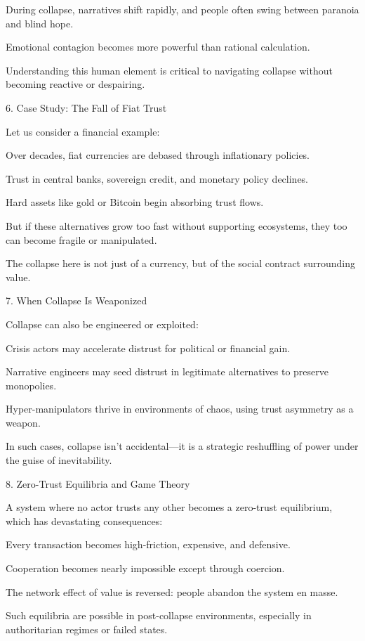 \documentclass[11pt,oneside]{book}
\begin{document}
    During collapse, narratives shift rapidly, and people often swing between paranoia and blind hope.

    Emotional contagion becomes more powerful than rational calculation.

Understanding this human element is critical to navigating collapse without becoming reactive or despairing.

6. Case Study: The Fall of Fiat Trust


Let us consider a financial example:

    Over decades, fiat currencies are debased through inflationary policies.

    Trust in central banks, sovereign credit, and monetary policy declines.

    Hard assets like gold or Bitcoin begin absorbing trust flows.

    But if these alternatives grow too fast without supporting ecosystems, they too can become fragile or manipulated.

The collapse here is not just of a currency, but of the social contract surrounding value.

7. When Collapse Is Weaponized


Collapse can also be engineered or exploited:

    Crisis actors may accelerate distrust for political or financial gain.

    Narrative engineers may seed distrust in legitimate alternatives to preserve monopolies.

    Hyper-manipulators thrive in environments of chaos, using trust asymmetry as a weapon.

In such cases, collapse isn’t accidental—it is a strategic reshuffling of power under the guise of inevitability.

8. Zero-Trust Equilibria and Game Theory


A system where no actor trusts any other becomes a zero-trust equilibrium, which has devastating consequences:

    Every transaction becomes high-friction, expensive, and defensive.

    Cooperation becomes nearly impossible except through coercion.

    The network effect of value is reversed: people abandon the system en masse.

Such equilibria are possible in post-collapse environments, especially in authoritarian regimes or failed states.
\end{document}
